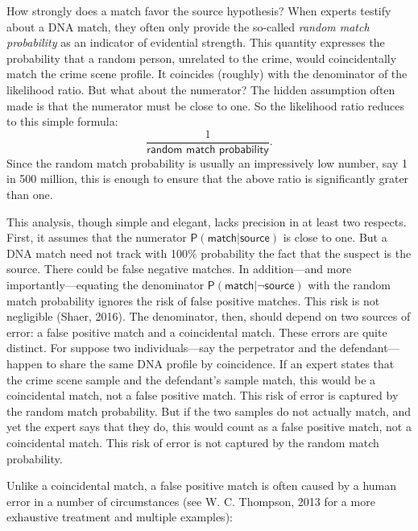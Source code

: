 \documentclass[
  10pt,
  dvipsnames,enabledeprecatedfontcommands]{scrartcl}
\newcommand{\raf}[1]{\todo[color=olive!40]{#1}}
\newcommand{\pr}[1]{\mathsf{P}(#1)}
\begin{document}
How strongly does a match favor the source hypothesis? When experts
testify about a DNA match, they often only provide the so-called
\emph{random match probability} as an indicator of evidential strength.
This quantity expresses the probability that a random person, unrelated
to the crime, would coincidentally match the crime scene profile. It
coincides (roughly) with the denominator of the likelihood ratio. But
what about the numerator? The hidden assumption often made is that the
numerator must be close to one. So the likelihood ratio reduces to this
simple formula: \[\frac{1}{\textsf{random match probability}}.\] Since
the random match probability is usually an impressively low number, say
1 in 500 million, this is enough to ensure that the above ratio is
significantly grater than one.

This analysis, though simple and elegant, lacks precision in at least
two respects. First, it assumes that the numerator
\(\pr{\textsf{match} \vert \textsf{source}}\) is close to one. But a DNA
match need not track with 100\% probability the fact that the suspect is
the source. There could be false negative matches. In addition---and
more importantly---equating the denominator
\(\pr{\textsf{match} \vert \neg \textsf{source}}\) with the random match
probability ignores the risk of false positive matches. This risk is not
negligible (Shaer, 2016). The denominator, then, should depend on two
sources of error: a false positive match and a coincidental match. These
errors are quite distinct. For suppose two individuals---say the
perpetrator and the defendant---happen to share the same DNA profile by
coincidence. If an expert states that the crime scene sample and the
defendant's sample match, this would be a coincidental match, not a
false positive match. This risk of error is captured by the random match
probability. But if the two samples do not actually match, and yet the
expert says that they do, this would count as a false positive match,
not a coincidental match. This risk of error is not captured by the
random match probability.

Unlike a coincidental match, a false positive match is often caused by a
human error in a number of circumstances (see W. C. Thompson, 2013 for a
more exhaustive treatment and multiple examples):

\raf{A: Bib references are missing here, is it on purpose?}
\end{document}
